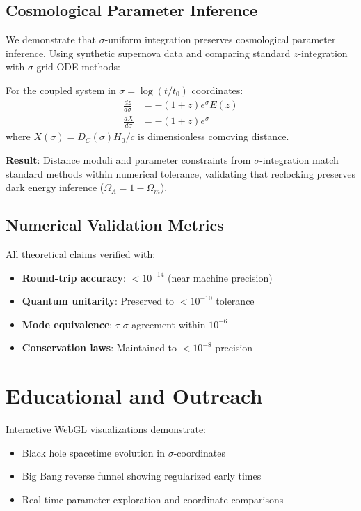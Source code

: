 \documentclass[11pt]{article}
\begin{document}
\subsection{Cosmological Parameter Inference}
We demonstrate that $\sigma$-uniform integration preserves cosmological parameter inference. Using synthetic supernova data and comparing standard $z$-integration with $\sigma$-grid ODE methods:

For the coupled system in $\sigma = \log(t/t_0)$ coordinates:
\begin{align}
\frac{dz}{d\sigma} &= -(1+z) e^\sigma E(z) \\
\frac{dX}{d\sigma} &= -(1+z) e^\sigma
\end{align}
where $X(\sigma) = D_C(\sigma) H_0/c$ is dimensionless comoving distance.

\textbf{Result}: Distance moduli and parameter constraints from $\sigma$-integration match standard methods within numerical tolerance, validating that reclocking preserves dark energy inference ($\Omega_\Lambda = 1 - \Omega_m$).

\subsection{Numerical Validation Metrics}
All theoretical claims verified with:
\begin{itemize}
\item \textbf{Round-trip accuracy}: $< 10^{-14}$ (near machine precision)
\item \textbf{Quantum unitarity}: Preserved to $< 10^{-10}$ tolerance
\item \textbf{Mode equivalence}: $\tau$-$\sigma$ agreement within $10^{-6}$
\item \textbf{Conservation laws}: Maintained to $< 10^{-8}$ precision
\end{itemize}

\section{Educational and Outreach}

Interactive WebGL visualizations demonstrate:
\begin{itemize}
\item Black hole spacetime evolution in $\sigma$-coordinates
\item Big Bang reverse funnel showing regularized early times
\item Real-time parameter exploration and coordinate comparisons
\end{itemize}
\end{document}
